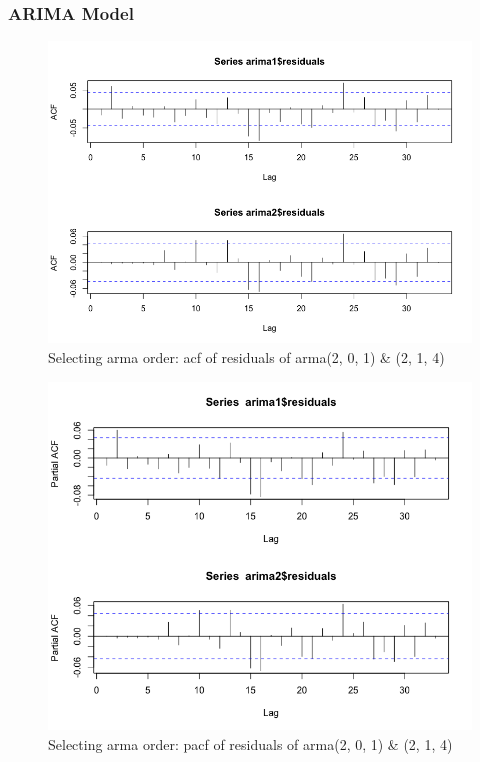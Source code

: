 \documentclass[a4paper,10pt]{article}
\begin{document}
\subsubsection{ARIMA Model}
\begin{figure}[H]
\centering
\caption{Selecting arma order: acf of residuals of arma(2, 0, 1) \& (2, 1, 4)}
\includegraphics[scale=.5]{armaacf.png}
\end{figure}

\begin{figure}[H]
\centering
\caption{Selecting arma order: pacf of residuals of arma(2, 0, 1) \& (2, 1, 4)}
\includegraphics[scale=.5]{arima_pacf.png}
\end{figure}
\end{document}
